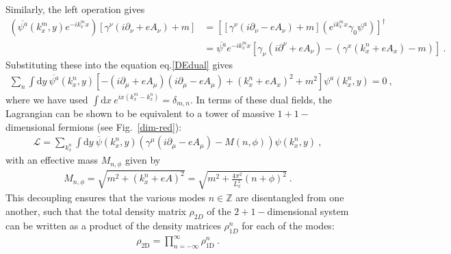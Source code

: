 Similarly, the left operation gives
\begin{equation}\begin{aligned}
	\left(\overline{\psi^a}(k_x^m,y) e^{-ik_x^m x}\right) \left[\gamma^\nu(i\partial_\nu + eA_\nu) + m\right] &= \left[\left[\gamma^\nu(i\partial_\nu - eA_\nu) + m\right]\left(e^{ik_x^m x}\gamma_0\psi^a\right)\right]^\dagger \\
							      &= \overline{\psi^a} e^{-ik_x^m x}\left[\gamma_\nu(i\partial^\nu + eA_\nu) - \left( \gamma^x (k_x^n + eA_x) - m \right) \right]~.
\end{aligned}\end{equation}
Substituting these into the equation eq.\eqref{DEdual} gives
\begin{equation}\begin{aligned}
	\sum_{n}\int\mathrm{d}y ~ \overline{\psi^a}(k_x^n,y) \left[-(i\partial_\mu + eA_\mu)(i\partial_\mu - eA_\mu) + (k_x^n + eA_x)^2 + m^2\right]\psi^a(k_x^n,y)= 0~,
\end{aligned}\end{equation}
where we have used \(\int \mathrm{d}x ~e^{ix\left( k_x^m - k_x^n \right) } = \delta_{m,n}\).
In terms of these dual fields, the Lagrangian can be shown to be equivalent to a tower of massive \(1+1-\)dimensional fermions (see Fig.~\ref{dim-red}):
\begin{equation}\begin{aligned}
\mathcal{L} = \sum_{k_x^n} \int \mathrm{d}y~\overline\psi(k_x^n,y)\left(\gamma^\mu (i\partial_\mu - eA_\mu) - M(n,\phi)\right) \psi(k_x^n,y)~,
\end{aligned}\end{equation}
with an effective mass $M_{n,\phi}$ given by
\begin{equation}\begin{aligned}
	M_{n,\phi} = \sqrt{m^2 + \left(k^n_x + eA\right)^2} = \sqrt{m^2 + \frac{4 \pi^2}{L_x^2}\left(n+\phi\right)^2}~.
\end{aligned}\end{equation}
This decoupling ensures that the various modes \(n\in\mathbb{Z}\) are disentangled from one another, such that the total density matrix \(\rho_{2D}\) of the \(2+1-\)dimensional system can be written as a product of the density matrices \(\rho_{1D}^n\) for each of the modes:
\begin{equation}\begin{aligned}
	\label{prod_rhod}
	\rho_\text{2D} = \prod_{n=-\infty}^\infty \rho^n_\text{1D}~.
\end{aligned}\end{equation}
